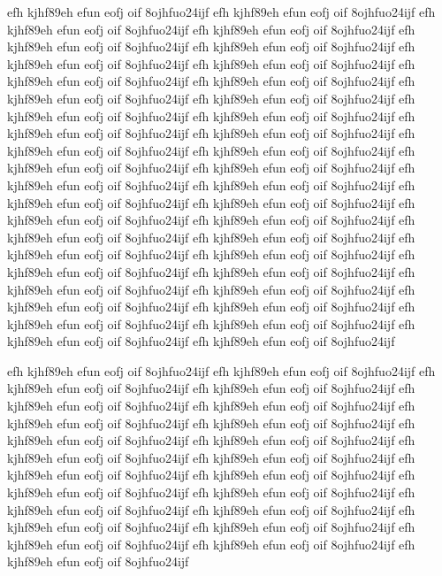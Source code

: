 \documentclass[a4paper,12pt]{book} %
\begin{document}
efh kjhf89eh efun eofj oif 8ojhfuo24ijf
efh kjhf89eh efun eofj oif 8ojhfuo24ijf
efh kjhf89eh efun eofj oif 8ojhfuo24ijf
efh kjhf89eh efun eofj oif 8ojhfuo24ijf
efh kjhf89eh efun eofj oif 8ojhfuo24ijf
efh kjhf89eh efun eofj oif 8ojhfuo24ijf
efh kjhf89eh efun eofj oif 8ojhfuo24ijf
efh kjhf89eh efun eofj oif 8ojhfuo24ijf
efh kjhf89eh efun eofj oif 8ojhfuo24ijf
efh kjhf89eh efun eofj oif 8ojhfuo24ijf
efh kjhf89eh efun eofj oif 8ojhfuo24ijf
efh kjhf89eh efun eofj oif 8ojhfuo24ijf
efh kjhf89eh efun eofj oif 8ojhfuo24ijf
efh kjhf89eh efun eofj oif 8ojhfuo24ijf
efh kjhf89eh efun eofj oif 8ojhfuo24ijf
efh kjhf89eh efun eofj oif 8ojhfuo24ijf
efh kjhf89eh efun eofj oif 8ojhfuo24ijf
efh kjhf89eh efun eofj oif 8ojhfuo24ijf
efh kjhf89eh efun eofj oif 8ojhfuo24ijf
efh kjhf89eh efun eofj oif 8ojhfuo24ijf
efh kjhf89eh efun eofj oif 8ojhfuo24ijf
efh kjhf89eh efun eofj oif 8ojhfuo24ijf
efh kjhf89eh efun eofj oif 8ojhfuo24ijf
efh kjhf89eh efun eofj oif 8ojhfuo24ijf
efh kjhf89eh efun eofj oif 8ojhfuo24ijf
efh kjhf89eh efun eofj oif 8ojhfuo24ijf
efh kjhf89eh efun eofj oif 8ojhfuo24ijf
efh kjhf89eh efun eofj oif 8ojhfuo24ijf
efh kjhf89eh efun eofj oif 8ojhfuo24ijf
efh kjhf89eh efun eofj oif 8ojhfuo24ijf
efh kjhf89eh efun eofj oif 8ojhfuo24ijf
efh kjhf89eh efun eofj oif 8ojhfuo24ijf
efh kjhf89eh efun eofj oif 8ojhfuo24ijf
efh kjhf89eh efun eofj oif 8ojhfuo24ijf
efh kjhf89eh efun eofj oif 8ojhfuo24ijf
efh kjhf89eh efun eofj oif 8ojhfuo24ijf
efh kjhf89eh efun eofj oif 8ojhfuo24ijf
efh kjhf89eh efun eofj oif 8ojhfuo24ijf
efh kjhf89eh efun eofj oif 8ojhfuo24ijf
efh kjhf89eh efun eofj oif 8ojhfuo24ijf

efh kjhf89eh efun eofj oif 8ojhfuo24ijf
efh kjhf89eh efun eofj oif 8ojhfuo24ijf
efh kjhf89eh efun eofj oif 8ojhfuo24ijf
efh kjhf89eh efun eofj oif 8ojhfuo24ijf
efh kjhf89eh efun eofj oif 8ojhfuo24ijf
efh kjhf89eh efun eofj oif 8ojhfuo24ijf
efh kjhf89eh efun eofj oif 8ojhfuo24ijf
efh kjhf89eh efun eofj oif 8ojhfuo24ijf
efh kjhf89eh efun eofj oif 8ojhfuo24ijf
efh kjhf89eh efun eofj oif 8ojhfuo24ijf
efh kjhf89eh efun eofj oif 8ojhfuo24ijf
efh kjhf89eh efun eofj oif 8ojhfuo24ijf
efh kjhf89eh efun eofj oif 8ojhfuo24ijf
efh kjhf89eh efun eofj oif 8ojhfuo24ijf
efh kjhf89eh efun eofj oif 8ojhfuo24ijf
efh kjhf89eh efun eofj oif 8ojhfuo24ijf
efh kjhf89eh efun eofj oif 8ojhfuo24ijf
efh kjhf89eh efun eofj oif 8ojhfuo24ijf
efh kjhf89eh efun eofj oif 8ojhfuo24ijf
efh kjhf89eh efun eofj oif 8ojhfuo24ijf
efh kjhf89eh efun eofj oif 8ojhfuo24ijf
efh kjhf89eh efun eofj oif 8ojhfuo24ijf
efh kjhf89eh efun eofj oif 8ojhfuo24ijf
\end{document}
